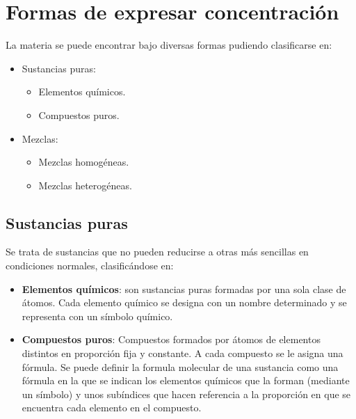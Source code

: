 \section{Formas de expresar concentración}
La materia se puede encontrar bajo diversas formas pudiendo clasificarse en:
\begin{multicols}{2}
    \begin{itemize}
        \item Sustancias puras:
        \begin{itemize}[itemsep=0pt,parsep=0pt,topsep=0pt,partopsep=0pt]
            \item Elementos químicos.
            \item Compuestos puros.
        \end{itemize}
        \item Mezclas:
        \begin{itemize}[itemsep=0pt,parsep=0pt,topsep=0pt,partopsep=0pt]
            \item Mezclas homogéneas.
            \item Mezclas heterogéneas.
        \end{itemize}
    \end{itemize}
\end{multicols}
\subsection{Sustancias puras}
Se trata de sustancias que no pueden reducirse a otras más sencillas en condiciones normales, clasificándose en:
\begin{itemize}[itemsep=0pt,parsep=0pt,topsep=0pt,partopsep=0pt]
    \item \textbf{Elementos químicos}: son sustancias puras formadas por una sola clase de átomos. Cada elemento químico se designa con un nombre determinado y se representa con un símbolo químico.
    \item\textbf{Compuestos puros}: Compuestos formados por átomos de elementos distintos en proporción fija y constante. A cada compuesto se le asigna una fórmula. Se puede definir la formula molecular de una sustancia como una fórmula en la que se indican los elementos químicos que la forman (mediante un símbolo) y unos subíndices que hacen referencia a la proporción en que se encuentra cada elemento en el compuesto.
\end{itemize}
